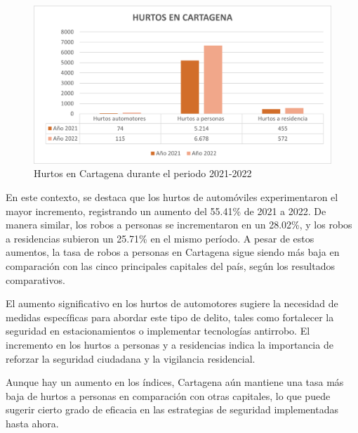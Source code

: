 \documentclass[letterpaper, 12pt]{article}
\begin{document}
\begin{figure}
    \begin{center}
        \includegraphics[width=.8\linewidth]{./Images/Graph.HurtosCartagena.png}
        \caption{Hurtos en Cartagena durante el periodo 2021-2022}
        \label{fig:Graph.HurtosCartagena}
    \end{center}
\end{figure}

En este contexto, se destaca que los hurtos de automóviles
experimentaron el mayor incremento, registrando un aumento
del 55.41\% de 2021 a 2022. De manera similar, los robos a
personas se incrementaron en un 28.02\%, y los robos a
residencias subieron un 25.71\% en el mismo período. A
pesar de estos aumentos, la tasa de robos a personas en
Cartagena sigue siendo más baja en comparación con las
cinco principales capitales del país, según los resultados
comparativos.

El aumento significativo en los hurtos de automotores
sugiere la necesidad de medidas específicas para abordar
este tipo de delito, tales como fortalecer la seguridad en
estacionamientos o implementar tecnologías antirrobo. El
incremento en los hurtos a personas y a residencias indica
la importancia de reforzar la seguridad ciudadana y la
vigilancia residencial.


Aunque hay un aumento en los índices, Cartagena aún
mantiene una tasa más baja de hurtos a personas en
comparación con otras capitales, lo que puede sugerir
cierto grado de eficacia en las estrategias de seguridad
implementadas hasta ahora.

\newpage

\printbibliography
\end{document}
